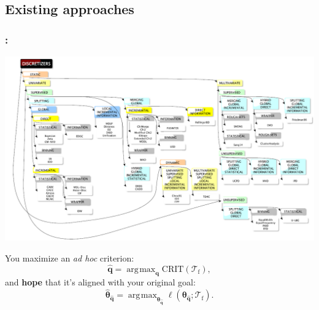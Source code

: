 \documentclass[english,xcolor={rgb,dvipsnames,table,usenames}]{beamer}
\DeclareMathOperator*{\argmax}{\arg\!\max}
\newcommand\q{{\bm{q}}}
\newcommand{\f}{\text{f}}
\begin{document}
\subsection{Existing approaches}
\begin{frame}
\frametitle{\secname: \subsecname}

\vspace*{-0.1cm}
\begin{center}
\includegraphics[scale=0.25]{figures/taxonomy.PNG}
\end{center}

You maximize an \textit{ad hoc} criterion:
\vspace*{-0.1cm}
\[ \hat{\q} = \argmax_{\q} \text{CRIT}(\mathcal{T}_\f), \]
\vspace*{-0.1cm}
and {\bf hope} that it's aligned with your original goal:
\vspace*{-0.1cm}
\[ \hat{\bm{\theta}}_{\hat{\q}} = \argmax_{\bm{\theta}_{\hat{\q}}} \ell(\bm{\theta}_{\hat{\q}} ; \mathcal{T}_\f). \]

\end{frame}
\end{document}
